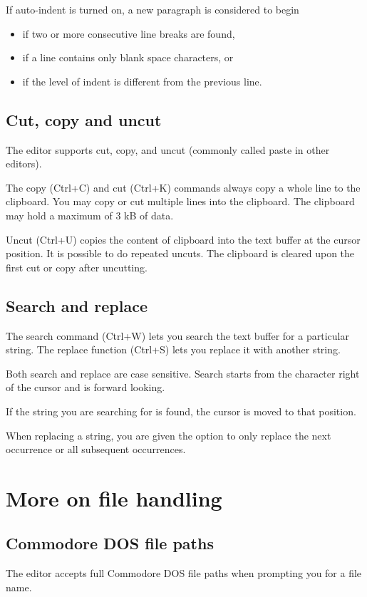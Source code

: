 \documentclass{article}
\begin{document}
        If auto-indent is turned on, a new paragraph is considered to begin

        \begin{itemize}
            \item if two or more consecutive line breaks are found, 
            \item if a line contains only blank space characters, or
            \item if the level of indent is different from the previous line.
        \end{itemize}

    \subsection{Cut, copy and uncut}
        The editor supports cut, copy, and uncut (commonly called paste in other editors).

        The copy (Ctrl+C) and cut (Ctrl+K) commands always copy a whole line to the clipboard. You may
        copy or cut multiple lines into the clipboard. The clipboard may hold a maximum of 3 kB of data.

        Uncut (Ctrl+U) copies the content of clipboard into the text buffer at the cursor position. It is possible
        to do repeated uncuts. The clipboard is cleared upon the first cut or copy after uncutting.

    \subsection{Search and replace}
        The search command (Ctrl+W) lets you search the text buffer for
        a particular string. The replace function (Ctrl+S)
        lets you replace it with another string.

        Both search and replace are case sensitive. Search starts from the character right of the cursor
        and is forward looking.

        If the string you are searching for is found, the cursor is moved to that position.

        When replacing a string, you are given the option to only replace the
        next occurrence or all subsequent occurrences.

\section{More on file handling}
    \subsection{Commodore DOS file paths}
    The editor accepts full Commodore DOS file paths when prompting you for a file name.
\end{document}
